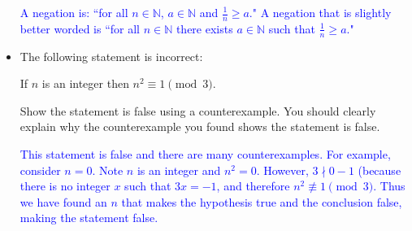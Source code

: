 \documentclass[10pt]{article}
\newcommand{\bs}{\begin{solution}}
\begin{document}
\begin{itemize}
\bs \textcolor{blue}{A negation is: ``for all $n\in\mathbb{N}$, $a\in\mathbb{N}$ and $\frac{1}{n}\geq a$." A negation that is slightly better worded is ``for all $n\in\mathbb{N}$ there exists $a\in\mathbb{N}$ such that $\frac{1}{n}\geq a$."}
\end{solution}

\vfill

\item[P3-1]  The following statement is incorrect:
		\begin{center}
		If $n$ is an integer then $n^2\equiv 1\pmod{3}$.
		\end{center}
			Show the statement is false using a counterexample. You should clearly explain why the counterexample you found shows the statement is false.


\bs \textcolor{blue}{This statement is false and there are many counterexamples. For example, consider $n=0$. Note $n$ is an integer and $n^2 = 0$. However, $3\nmid 0-1$ (because there is no integer $x$ such that $3x=-1$, and therefore $n^2\not\equiv 1\pmod{3}$. Thus we have found an $n$ that makes the hypothesis true and the conclusion false, making the statement false.}\end{solution}
\vfill
\end{itemize}
	
\end{document}
